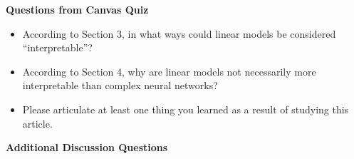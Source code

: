 \documentclass[12pt]{../notes}
\begin{document}
\textbf{Questions from Canvas Quiz}
\begin{itemize}
\item According to Section 3, in what ways could linear models be considered ``interpretable''?
\item According to Section 4, why are linear models not necessarily more interpretable than complex neural networks? 
\item Please articulate at least one thing you learned as a result of studying this article. 
\end{itemize}

\nspace

\textbf{Additional Discussion Questions} 


\begin{minipage}[l][8cm][c]{\textwidth}
\begin{comment}
\note{Interpretable:
\bi
\item Relatively easy to explain how the model works. 
\item Each explanatory variable is associated with a single number that we can directly interpret (assuming no interactions). 
\ei}

\note{NOT Interpretable:
\bi
\item Linear models are often heavily manipulated ``by hand'', making it hard to separate what is a product of the data, from what is a product of our manipulations. 
\item If our associations are plagued by \textbf{confounding variables} or the data itself contains bias or prejudice, we may make inappropriate conclusions from our model, regardless of the satisfaction of assumptions.  
\ei}
\end{comment}
\end{minipage}


\begin{minipage}[l][4cm][c]{\textwidth}
\begin{comment}
\note{Consider the European Unions Law requiring a "right to explanation'' (\url{https://arxiv.org/pdf/1606.08813.pdf}). As more and more significant decisions begin being made by algorithms, more and more people will want to know why and how those decisions are being made. 
\newline
\newline
Example: a person would probably like to know why a statistical algorithm denied them the opportunity for a home loan.}
\end{comment}
\end{minipage}
\end{document}
